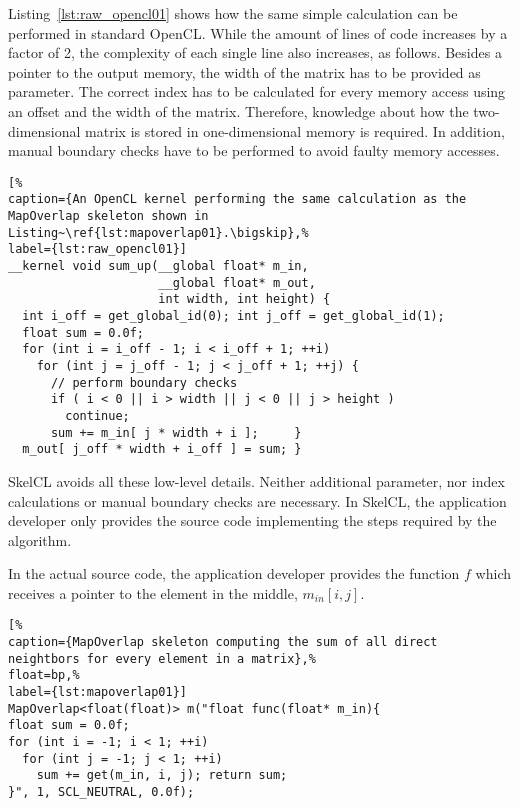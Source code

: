 Listing~\ref{lst:raw_opencl01} shows how the same simple calculation can be performed in standard OpenCL.
While the amount of lines of code increases by a factor of 2, the complexity of each single line also increases, as follows.
Besides a pointer to the output memory, the width of the matrix has to be provided as parameter.
The correct index has to be calculated for every memory access using an offset and the width of the matrix.
Therefore, knowledge about how the two-dimensional matrix is stored in one-dimensional memory is required.
In addition, manual boundary checks have to be performed to avoid faulty memory accesses.\bigskip

\begin{lstlisting}[%
caption={An OpenCL kernel performing the same calculation as the MapOverlap skeleton shown in Listing~\ref{lst:mapoverlap01}.\bigskip},%
label={lst:raw_opencl01}]
__kernel void sum_up(__global float* m_in,
                     __global float* m_out,
                     int width, int height) {
  int i_off = get_global_id(0); int j_off = get_global_id(1);
  float sum = 0.0f;
  for (int i = i_off - 1; i < i_off + 1; ++i)
    for (int j = j_off - 1; j < j_off + 1; ++j) {
      // perform boundary checks
      if ( i < 0 || i > width || j < 0 || j > height )
        continue;
      sum += m_in[ j * width + i ];     }
  m_out[ j_off * width + i_off ] = sum; }
\end{lstlisting}

SkelCL avoids all these low-level details.
Neither additional parameter, nor index calculations or manual boundary checks are necessary.
In SkelCL, the application developer only provides the source code implementing the steps required by the algorithm.


In the actual source code, the application developer provides the function $f$ which receives a pointer to the element in the middle, $m_{in}[i,j]$.

\begin{lstlisting}[%
caption={MapOverlap skeleton computing the sum of all direct neightbors for every element in a matrix},%
float=bp,%
label={lst:mapoverlap01}]
MapOverlap<float(float)> m("float func(float* m_in){
float sum = 0.0f;
for (int i = -1; i < 1; ++i)
  for (int j = -1; j < 1; ++i)
    sum += get(m_in, i, j); return sum;
}", 1, SCL_NEUTRAL, 0.0f);
\end{lstlisting}



